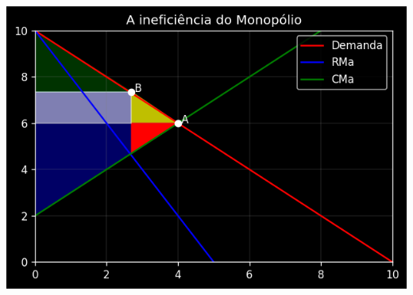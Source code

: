 \documentclass[a4paper,11pt,oneside]{book}
\theoremstyle{definition}
\theoremstyle{break}
\begin{document}
\begin{center}
\includegraphics[scale=0.8]{cap25_5-onus_monopolio.png}
\end{center}
\end{document}
